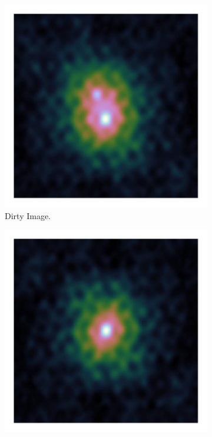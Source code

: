 \begin{figure}[h]
	\centering
	\begin{subfigure}[b]{0.3\linewidth}
		\includegraphics[width=\linewidth, clip, trim= 0.25in 0.25in 0.25in 0.25in]{./chapters/03.cd/simulated/dirty.png}
		\caption{Dirty Image.}
		\label{radio:alg:dirty}
	\end{subfigure}
	\begin{subfigure}[b]{0.3\linewidth}
		\includegraphics[width=\linewidth, clip, trim= 0.25in 0.25in 0.25in 0.25in]{./chapters/03.cd/simulated/psf.png}

\end{subfigure}
\end{figure}
